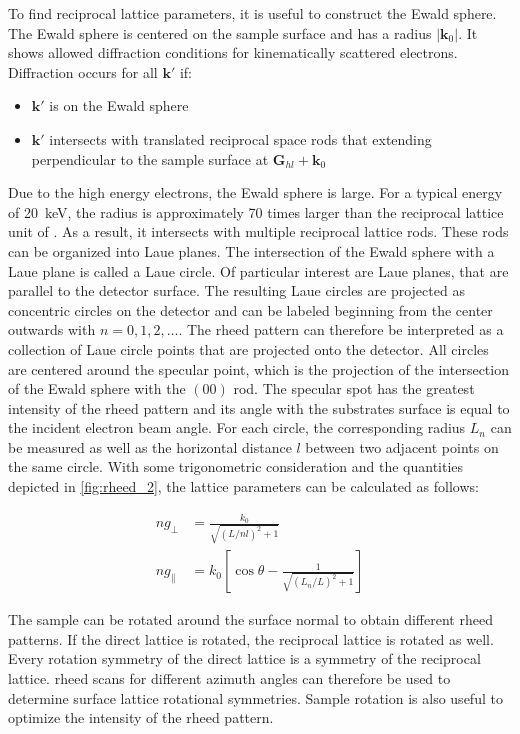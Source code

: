 To find reciprocal lattice parameters, it is useful to construct the Ewald sphere.
The Ewald sphere is centered on the sample surface and has a radius 
$\lvert \mathbf{k}_0 \rvert$.
It shows allowed diffraction conditions for kinematically scattered electrons.
Diffraction occurs for all $\mathbf{k}'$ if:
\begin{itemize}
	\item $\mathbf{k}'$ is on the Ewald sphere
	\item $\mathbf{k}'$ intersects with translated reciprocal space rods that extending
		perpendicular to the sample surface at $\mathbf{G}_{hl}+\mathbf{k}_{0}$
\end{itemize}

Due to the high energy electrons, the Ewald sphere is large.
For a typical energy of \qty{20}{\kilo \electronvolt}, the radius is
approximately \num{70} times larger than the reciprocal lattice unit of .
As a result, it intersects with multiple reciprocal lattice rods. 
These rods can be organized into Laue planes.
The intersection of the Ewald sphere with a Laue plane is called a Laue circle.
Of particular interest are Laue planes, that are parallel to the detector surface.
The resulting Laue circles are projected as concentric circles on the detector
and can be labeled beginning from the center outwards with $n=0,1,2,\ldots$.
The \ac{rheed} pattern can therefore be interpreted as a collection of Laue circle 
points that are projected onto the detector.
All circles are centered around the specular point, which is the projection of the 
intersection of the Ewald sphere with the $(00)$ rod.
The specular spot has the greatest intensity of the \ac{rheed} pattern and its angle
with the substrates surface is equal to the incident electron beam angle.
For each circle, the corresponding radius $L_{n}$ can be measured as 
well as the horizontal distance $l$ between two adjacent points on the same circle.
With some trigonometric consideration and the quantities depicted in \cref{fig:rheed_2},
the lattice parameters can be calculated as follows:

\begin{align}
n g_{\perp} &=\frac{k_{0}}{\sqrt{ (L/nl)^{2}+1 }} \\
ng_{\parallel} &= k_{0} \left[ \cos\theta-\frac{1}{\sqrt{ (L_{n} / L)^{2}+1 }} \right]
\end{align}

The sample can be rotated around the surface normal to obtain different
\ac{rheed} patterns.
If the direct lattice is rotated, the reciprocal lattice is rotated as well.
Every rotation symmetry of the direct lattice is a symmetry of the reciprocal 
lattice.
\ac{rheed} scans for different azimuth angles can therefore be used to determine 
surface lattice rotational symmetries.   
Sample rotation is also useful to optimize the intensity of the \ac{rheed} pattern.

